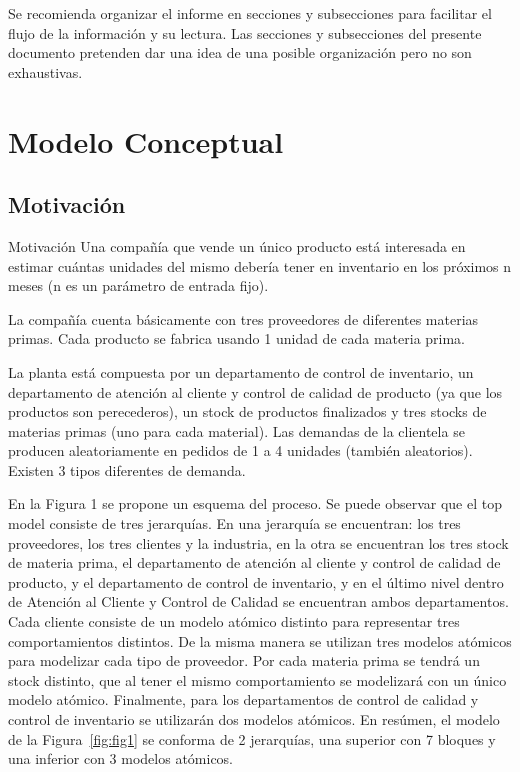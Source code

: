 \documentclass[10pt]{article}
\begin{document}
Se recomienda organizar el informe en secciones y subsecciones para facilitar el flujo de la información y su lectura. Las secciones y subsecciones del presente documento pretenden dar una idea de una posible organización pero no son exhaustivas.



\section{Modelo Conceptual}
\subsection{Motivación}
Motivación
Una compañía que vende un único producto está interesada en estimar cuántas unidades del mismo debería tener en inventario en los próximos n meses (n es un parámetro de entrada fijo).

La compañía cuenta básicamente con tres proveedores de diferentes materias primas. Cada producto se fabrica usando 1 unidad de cada materia prima.

La planta está compuesta por un departamento de control de inventario, un departamento de atención al cliente y control de calidad de producto (ya que los productos son perecederos), un stock de productos finalizados y tres stocks de materias primas (uno para cada material). Las demandas de la clientela se producen aleatoriamente en pedidos de 1 a 4 unidades (también aleatorios). Existen 3 tipos diferentes de demanda.

En la Figura 1 se propone un esquema del proceso. Se puede observar que el top model consiste de tres jerarquías. En una jerarquía se encuentran: los tres proveedores, los tres clientes y la industria, en la otra se encuentran los tres stock de materia prima, el departamento de atención al cliente y control de calidad de producto, y el departamento de control de inventario, y en el último nivel dentro de Atención al Cliente y Control de Calidad se encuentran ambos departamentos. Cada cliente consiste de un modelo atómico distinto para representar tres comportamientos distintos. De la misma manera se utilizan tres modelos atómicos para modelizar cada tipo de proveedor. Por cada materia prima se tendrá un stock distinto, que al tener el mismo comportamiento se modelizará con un único modelo atómico. Finalmente, para los departamentos de control de calidad y control de inventario se utilizarán dos modelos atómicos. En resúmen, el modelo de la Figura~\ref{fig:fig1} se conforma de 2 jerarquías, una superior con 7 bloques y una inferior con 3 modelos atómicos.
\end{document}
